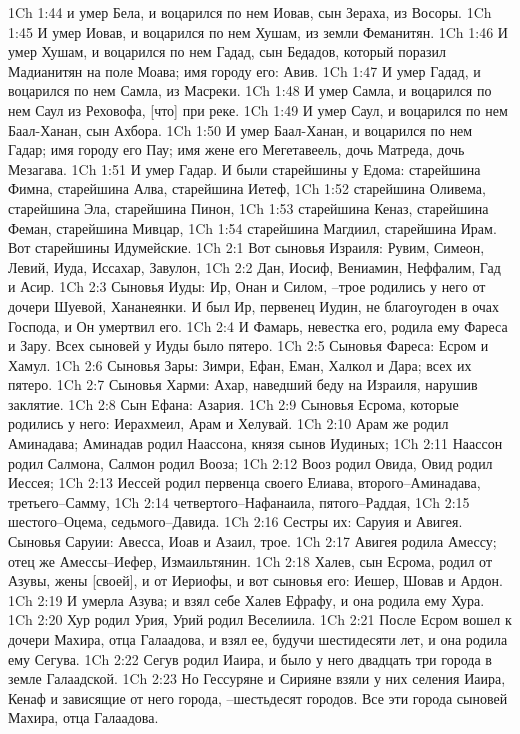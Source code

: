 1Ch 1:44  и умер Бела, и воцарился по нем Иовав, сын Зераха, из Восоры.
1Ch 1:45  И умер Иовав, и воцарился по нем Хушам, из земли Феманитян.
1Ch 1:46  И умер Хушам, и воцарился по нем Гадад, сын Бедадов, который поразил Мадианитян на поле Моава; имя городу его: Авив.
1Ch 1:47  И умер Гадад, и воцарился по нем Самла, из Масреки.
1Ch 1:48  И умер Самла, и воцарился по нем Саул из Реховофа, [что] при реке.
1Ch 1:49  И умер Саул, и воцарился по нем Баал-Ханан, сын Ахбора.
1Ch 1:50  И умер Баал-Ханан, и воцарился по нем Гадар; имя городу его Пау; имя жене его Мегетавеель, дочь Матреда, дочь Мезагава.
1Ch 1:51  И умер Гадар. И были старейшины у Едома: старейшина Фимна, старейшина Алва, старейшина Иетеф,
1Ch 1:52  старейшина Оливема, старейшина Эла, старейшина Пинон,
1Ch 1:53  старейшина Кеназ, старейшина Феман, старейшина Мивцар,
1Ch 1:54  старейшина Магдиил, старейшина Ирам. Вот старейшины Идумейские.
1Ch 2:1  Вот сыновья Израиля: Рувим, Симеон, Левий, Иуда, Иссахар, Завулон,
1Ch 2:2  Дан, Иосиф, Вениамин, Неффалим, Гад и Асир.
1Ch 2:3  Сыновья Иуды: Ир, Онан и Силом, --трое родились у него от дочери Шуевой, Хананеянки. И был Ир, первенец Иудин, не благоугоден в очах Господа, и Он умертвил его.
1Ch 2:4  И Фамарь, невестка его, родила ему Фареса и Зару. Всех сыновей у Иуды было пятеро.
1Ch 2:5  Сыновья Фареса: Есром и Хамул.
1Ch 2:6  Сыновья Зары: Зимри, Ефан, Еман, Халкол и Дара; всех их пятеро.
1Ch 2:7  Сыновья Харми: Ахар, наведший беду на Израиля, нарушив заклятие.
1Ch 2:8  Сын Ефана: Азария.
1Ch 2:9  Сыновья Есрома, которые родились у него: Иерахмеил, Арам и Хелувай.
1Ch 2:10  Арам же родил Аминадава; Аминадав родил Наассона, князя сынов Иудиных;
1Ch 2:11  Наассон родил Салмона, Салмон родил Вооза;
1Ch 2:12  Вооз родил Овида, Овид родил Иессея;
1Ch 2:13  Иессей родил первенца своего Елиава, второго--Аминадава, третьего--Самму,
1Ch 2:14  четвертого--Нафанаила, пятого--Раддая,
1Ch 2:15  шестого--Оцема, седьмого--Давида.
1Ch 2:16  Сестры их: Саруия и Авигея. Сыновья Саруии: Авесса, Иоав и Азаил, трое.
1Ch 2:17  Авигея родила Амессу; отец же Амессы--Иефер, Измаильтянин.
1Ch 2:18  Халев, сын Есрома, родил от Азувы, жены [своей], и от Иериофы, и вот сыновья его: Иешер, Шовав и Ардон.
1Ch 2:19  И умерла Азува; и взял себе Халев Ефрафу, и она родила ему Хура.
1Ch 2:20  Хур родил Урия, Урий родил Веселиила.
1Ch 2:21  После Есром вошел к дочери Махира, отца Галаадова, и взял ее, будучи шестидесяти лет, и она родила ему Сегува.
1Ch 2:22  Сегув родил Иаира, и было у него двадцать три города в земле Галаадской.
1Ch 2:23  Но Гессуряне и Сирияне взяли у них селения Иаира, Кенаф и зависящие от него города, --шестьдесят городов. Все эти города сыновей Махира, отца Галаадова.
